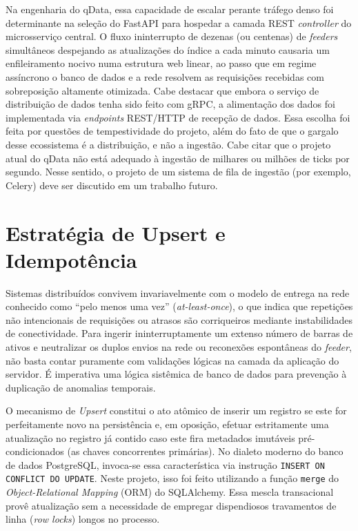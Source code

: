 Na engenharia do qData, essa capacidade de escalar perante tráfego denso foi determinante na seleção do FastAPI para hospedar a camada REST \textit{controller} do microsserviço central. O fluxo ininterrupto de dezenas (ou centenas) de \textit{feeders} simultâneos despejando as atualizações do índice a cada minuto causaria um enfileiramento nocivo numa estrutura web linear, ao passo que em regime assíncrono o banco de dados e a rede resolvem as requisições recebidas com sobreposição altamente otimizada. Cabe destacar que embora o serviço de distribuição de dados tenha sido feito com gRPC, a alimentação dos dados foi implementada via \textit{endpoints} REST/HTTP de recepção de dados. Essa escolha foi feita por questões de tempestividade do projeto, além do fato de que o gargalo desse ecossistema é a distribuição, e não a ingestão. Cabe citar que o projeto atual do qData não está adequado à ingestão de milhares ou milhões de ticks por segundo. Nesse sentido, o projeto de um sistema de fila de ingestão (por exemplo, Celery) deve ser discutido em um trabalho futuro.

\section{Estratégia de Upsert e Idempotência}

Sistemas distribuídos convivem invariavelmente com o modelo de entrega na rede conhecido como ``pelo menos uma vez'' (\textit{at-least-once}), o que indica que repetições não intencionais de requisições ou atrasos são corriqueiros mediante instabilidades de conectividade. Para ingerir ininterruptamente um extenso número de barras de ativos e neutralizar os duplos envios na rede ou reconexões espontâneas do \textit{feeder}, não basta contar puramente com validações lógicas na camada da aplicação do servidor. É imperativa uma lógica sistêmica de banco de dados para prevenção à duplicação de anomalias temporais.

O mecanismo de \textit{Upsert} constitui o ato atômico de inserir um registro se este for perfeitamente novo na persistência e, em oposição, efetuar estritamente uma atualização no registro já contido caso este fira metadados imutáveis pré-condicionados (as chaves concorrentes primárias). No dialeto moderno do banco de dados PostgreSQL, invoca-se essa característica via instrução \texttt{INSERT ON CONFLICT DO UPDATE}. Neste projeto, isso foi feito utilizando a função \texttt{merge} do \textit{Object-Relational Mapping} (ORM) do SQLAlchemy. Essa mescla transacional provê atualização sem a necessidade de empregar dispendiosos travamentos de linha (\textit{row locks}) longos no processo.


